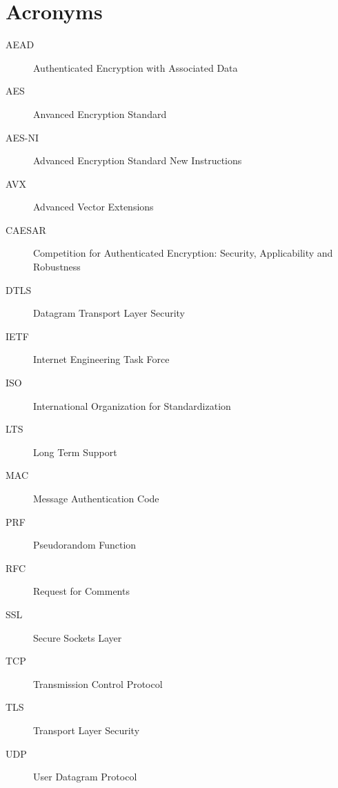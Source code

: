 \chapter{Acronyms}

\begin{description}
  \item[AEAD] Authenticated Encryption with Associated Data
  \item[AES] Anvanced Encryption Standard
  \item[AES-NI] Advanced Encryption Standard New Instructions
  \item[AVX] Advanced Vector Extensions
  \item[CAESAR] Competition for Authenticated Encryption: Security, Applicability and Robustness
  \item[DTLS] Datagram Transport Layer Security
  \item[IETF] Internet Engineering Task Force
  \item[ISO] International Organization for Standardization
  \item[LTS] Long Term Support
  \item[MAC] Message Authentication Code
  \item[PRF] Pseudorandom Function
  \item[RFC] Request for Comments
  \item[SSL] Secure Sockets Layer
  \item[TCP] Transmission Control Protocol
  \item[TLS] Transport Layer Security
  \item[UDP] User Datagram Protocol
\end{description}
